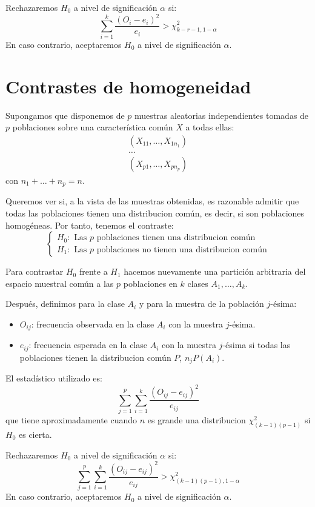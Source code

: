Rechazaremos $H_0$ a nivel de significación $\alpha$ si:
$$\sum_{i=1}^k \frac{(O_i-e_i)^2}{e_i} > \chi^2_{k-r-1, 1-\alpha}$$
En caso contrario, aceptaremos $H_0$ a nivel de significación $\alpha$.


\section{Contrastes de homogeneidad}
Supongamos que disponemos de $p$ muestras aleatorias independientes tomadas de $p$ poblaciones sobre una característica común $X$ a todas ellas:
\begin{align*}
    (X_{11}, \dots, X_{1n_1}) \\
    \dots                     \\
    (X_{p1}, \dots, X_{pn_p})
\end{align*}
con $n_1 + \dots + n_p = n$.

Queremos ver si, a la vista de las muestras obtenidas, es razonable admitir que todas las poblaciones tienen una distribucion común, es decir, si son poblaciones homogéneas.
Por tanto, tenemos el contraste:
$$\begin{cases}
        H_0: \text{ Las } p \text{ poblaciones tienen una distribucion común} \\
        H_1: \text{ Las } p \text{ poblaciones no tienen una distribucion común}
    \end{cases}$$

Para contrastar $H_0$ frente a $H_1$ hacemos nuevamente una partición arbitraria del espacio muestral común a las $p$ poblaciones en $k$ clases $A_1, \dots, A_k$.

Después, definimos para la clase $A_i$ y para la muestra de la población $j$-ésima:
\begin{itemize}
    \item $O_{ij}$: frecuencia observada en la clase $A_i$ con la muestra $j$-ésima.
    \item $e_{ij}$: frecuencia esperada en la clase $A_i$ con la muestra $j$-ésima si todas las poblaciones tienen la distribucion común $P$, $n_jP(A_i)$.
\end{itemize}

El estadístico utilizado es:
$$\sum_{j=1}^p \sum_{i=1}^k \frac{(O_{ij}-e_{ij})^2}{e_{ij}}$$
que tiene aproximadamente cuando $n$ es grande una distribucion $\chi^2_{(k-1)(p-1)}$ si $H_0$ es cierta.

Rechazaremos $H_0$ a nivel de significación $\alpha$ si:
$$\sum_{j=1}^p \sum_{i=1}^k \frac{(O_{ij}-e_{ij})^2}{e_{ij}} > \chi^2_{(k-1)(p-1), 1-\alpha}$$
En caso contrario, aceptaremos $H_0$ a nivel de significación $\alpha$.

